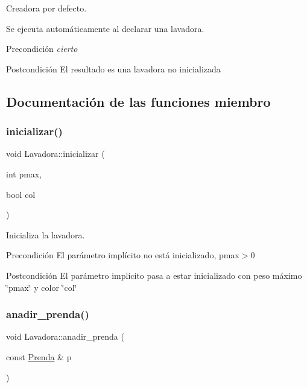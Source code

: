 Creadora por defecto. 

Se ejecuta automáticamente al declarar una lavadora. \begin{DoxyPrecond}{Precondición}
{\itshape cierto} 
\end{DoxyPrecond}
\begin{DoxyPostcond}{Postcondición}
El resultado es una lavadora no inicializada 
\end{DoxyPostcond}


\subsection{Documentación de las funciones miembro}
\mbox{\label{class_lavadora_a733af02910dca3f75390be4ca6ac84f6}} 
\subsubsection{\texorpdfstring{inicializar()}{inicializar()}}
{\footnotesize\ttfamily void Lavadora\+::inicializar (\begin{DoxyParamCaption}\item[{int}]{pmax,  }\item[{bool}]{col }\end{DoxyParamCaption})}



Inicializa la lavadora. 

\begin{DoxyPrecond}{Precondición}
El parámetro implícito no está inicializado, pmax$>$0 
\end{DoxyPrecond}
\begin{DoxyPostcond}{Postcondición}
El parámetro implícito pasa a estar inicializado con peso máximo \char`\"{}pmax\char`\"{} y color \char`\"{}col\char`\"{} 
\end{DoxyPostcond}
\mbox{\label{class_lavadora_a7e465e1f11ba5ba3cffcee1ce9507e79}} 
\subsubsection{\texorpdfstring{anadir\+\_\+prenda()}{anadir\_prenda()}}
{\footnotesize\ttfamily void Lavadora\+::anadir\+\_\+prenda (\begin{DoxyParamCaption}\item[{const \mbox{\hyperlink{class_prenda}{Prenda}} \&}]{p }\end{DoxyParamCaption})}



